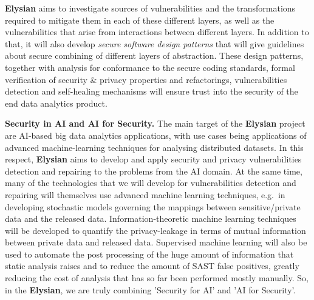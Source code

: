 \documentclass[a4paper,11pt]{article}
\newcommand{\project}[1]{\textbf{#1}\xspace}
\newcommand{\SECURITY}{\project{Elysian}}
\newcommand{\TheProject}{\SECURITY}
\begin{document}
\TheProject{} aims to investigate sources of vulnerabilities and the transformations required to mitigate them in each of these different layers, as well as the vulnerabilities that arise from interactions between different layers. In addition to that, it will also develop \emph{secure software design patterns} that will give guidelines about secure combining of different layers of abstraction. These design patterns, together with analysis for conformance to the secure coding standards, formal verification of security \& privacy properties and  refactorings, vulnerabilities detection and self-healing mechanisms will ensure trust into the security 
of the end data analytics product.

\begin{mdframed}[backgroundcolor=blue!5]
\textbf{Security in AI and AI for Security.}
The main target of the \TheProject{} project are AI-based big data analytics applications, with use cases being applications of advanced machine-learning techniques for analysing distributed datasets. In this respect, \TheProject{} aims to develop and apply security and privacy vulnerabilities detection and repairing to the problems from the AI domain. At the same time, many of the technologies that we will develop for vulnerabilities detection and repairing will themselves use advanced machine learning techniques, e.g.~in developing stochastic models governing the mappings between sensitive/private data and the released data. Information-theoretic machine learning techniques will be developed to quantify the privacy-leakage in terms of mutual information between private data and released data. Supervised machine learning will also be used to automate the post processing of the huge amount of information that static analysis raises and to reduce the amount of SAST false positives, greatly reducing the cost of analysis that has so far been performed mostly manually. So, in the \TheProject{}, we are truly combining 'Security for AI' and 'AI for Security'.
\end{mdframed}
\end{document}
